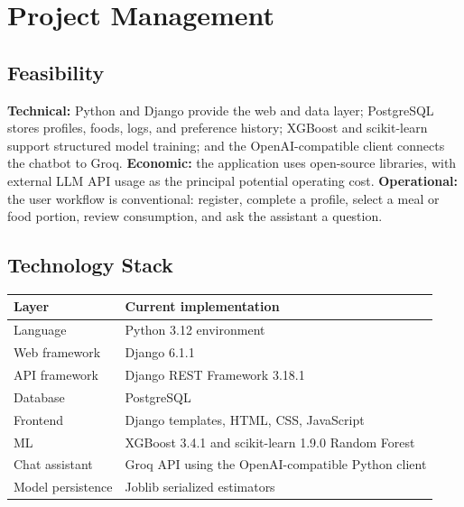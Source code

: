 \documentclass[12pt,a4paper]{report}
\begin{document}
\chapter{Project Management}
\section{Feasibility}
\textbf{Technical:} Python and Django provide the web and data layer; PostgreSQL stores
profiles, foods, logs, and preference history; XGBoost and scikit-learn support structured
model training; and the OpenAI-compatible client connects the chatbot to Groq.
\textbf{Economic:} the application uses open-source libraries, with external LLM API
usage as the principal potential operating cost. \textbf{Operational:} the user workflow
is conventional: register, complete a profile, select a meal or food portion, review
consumption, and ask the assistant a question.

\section{Technology Stack}
\begin{longtable}{p{}p{}}
\toprule
Layer & Current implementation\\
\midrule
Language & Python 3.12 environment\\
Web framework & Django 6.1.1\\
API framework & Django REST Framework 3.18.1\\
Database & PostgreSQL\\
Frontend & Django templates, HTML, CSS, JavaScript\\
ML & XGBoost 3.4.1 and scikit-learn 1.9.0 Random Forest\\
Chat assistant & Groq API using the OpenAI-compatible Python client\\
Model persistence & Joblib serialized estimators\\
\bottomrule
\end{longtable}
\end{document}
